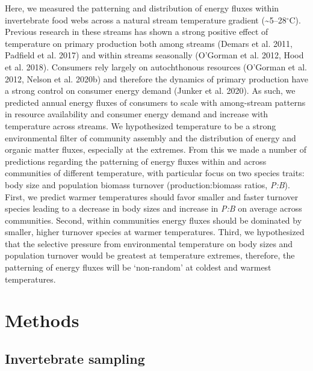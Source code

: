 \documentclass[
]{article}
\begin{document}
Here, we measured the patterning and distribution of energy fluxes
within invertebrate food webs across a natural stream temperature
gradient (\textasciitilde5--28\(^\circ\)C). Previous research in these
streams has shown a strong positive effect of temperature on primary
production both among streams (Demars et al. 2011, Padfield et al. 2017)
and within streams seasonally (O'Gorman et al. 2012, Hood et al. 2018).
Consumers rely largely on autochthonous resources (O'Gorman et al. 2012,
Nelson et al. 2020b) and therefore the dynamics of primary production
have a strong control on consumer energy demand (Junker et al. 2020). As
such, we predicted annual energy fluxes of consumers to scale with
among-stream patterns in resource availability and consumer energy
demand and increase with temperature across streams. We hypothesized
temperature to be a strong environmental filter of community assembly
and the distribution of energy and organic matter fluxes, especially at
the extremes. From this we made a number of predictions regarding the
patterning of energy fluxes within and across communities of different
temperature, with particular focus on two species traits: body size and
population biomass turnover (production:biomass ratios, \emph{P:B}).
First, we predict warmer temperatures should favor smaller and faster
turnover species leading to a decrease in body sizes and increase in
\emph{P:B} on average across communities. Second, within communities
energy fluxes should be dominated by smaller, higher turnover species at
warmer temperatures. Third, we hypothesized that the selective pressure
from environmental temperature on body sizes and population turnover
would be greatest at temperature extremes, therefore, the patterning of
energy fluxes will be `non-random' at coldest and warmest temperatures.

\hypertarget{methods}{%
\section{Methods}\label{methods}}

\hypertarget{invertebrate-sampling}{%
\subsection{Invertebrate sampling}\label{invertebrate-sampling}}
\end{document}
